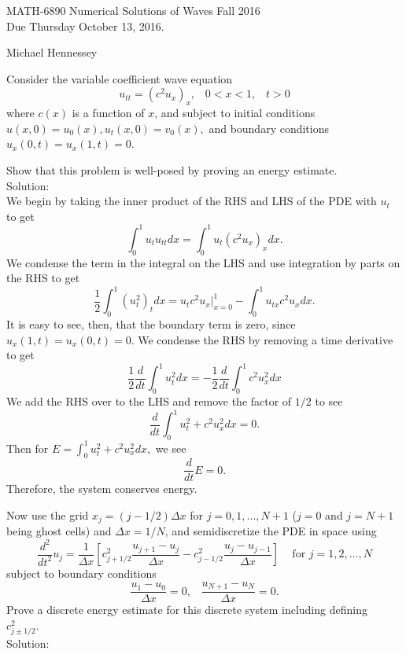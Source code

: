 
\pagestyle{empty}


\begin{center}
\large{ MATH-6890 \hspace{1in} Numerical Solutions of Waves  \hspace{1in}Fall 2016 \\ Due Thursday October 13, 2016.}\end{center}
Michael Hennessey

\bigskip
{} \ec
\benum 
\item Consider the variable coefficient wave equation
$$u_{tt}=(c^2 u_x)_x,\;\;\;0<x<1,\;\;\; t>0$$
where $c(x)$ is a function of $x$, and subject to initial conditions $u(x,0)=u_0(x),u_t(x,0)=v_0(x),$ and boundary conditions $u_x(0,t)=u_x(1,t)=0.$
\benum
\item Show that this problem is well-posed by proving an energy estimate.\\
Solution:\\
We begin by taking the inner product of the RHS and LHS of the PDE with $u_t$ to get
$$\int_0^1u_tu_{tt}dx=\int_0^1u_t(c^2u_x)_xdx.$$
We condense the term in the integral on the LHS and use integration by parts on the RHS to get
$$\frac{1}{2}\int_0^1(u_t^2)_tdx=u_tc^2u_x|_{x=0}^1-\int_0^1u_{tx}c^2u_xdx.$$
It is easy to see, then, that the boundary term is zero, since $u_x(1,t)=u_x(0,t)=0.$ We condense the RHS by removing a time derivative to get
$$\frac{1}{2}\frac{d}{dt}\int_0^1u_t^2dx=-\frac{1}{2}\frac{d}{dt}\int_0^1c^2u_x^2dx$$
We add the RHS over to the LHS and remove the factor of $1/2$ to see
$$\frac{d}{dt}\int_0^1u_t^2+c^2u_x^2dx=0.$$
Then for $E=\int_0^1u_t^2+c^2u_x^2dx,$ we see
$$\frac{d}{dt}E=0.$$
Therefore, the system conserves energy.

\item Now use the grid $x_j=(j-1/2)\Delta x$ for $j=0,1,...,N+1$ ($j=0$ and $j=N+1$ being ghost cells) and $\Delta x=1/N$, and semidiscretize the PDE in space using
$$\frac{d^2}{dt^2}u_j=\frac{1}{\Delta x}\left[c_{j+1/2}^2\frac{u_{j+1}-u_j}{\Delta x}-c_{j-1/2}^2\frac{u_j-u_{j-1}}{\Delta x}\right]\;\;\; \text{ for }j=1,2,...,N$$
subject to boundary conditions
$$\frac{u_1-u_0}{\Delta x}=0,\;\;\;\frac{u_{N+1}-u_N}{\Delta x}=0.$$
Prove a discrete energy estimate for this discrete system including defining $c_{j\pm 1/2}^2.$\\
Solution:\\

